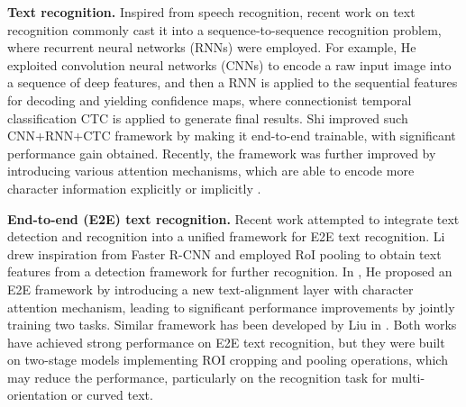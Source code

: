 \documentclass[10pt,twocolumn,letterpaper]{article}
\begin{document}
\textbf{Text recognition.} Inspired from speech recognition, recent work on text recognition commonly cast it into a sequence-to-sequence recognition problem, where recurrent neural networks (RNNs) were employed. For example, He \etal \cite{he2016reading} exploited convolution neural networks (CNNs) to encode a raw input image into a sequence of deep features, and then a RNN is applied to the sequential features for decoding and yielding confidence maps, where connectionist temporal classification CTC \cite{graves2006connectionist} is applied to generate final results. Shi \etal \cite{shi2017end} improved such CNN+RNN+CTC framework by making it end-to-end trainable, with significant performance gain obtained. Recently, the framework was further improved by introducing various attention mechanisms, which are able to encode more character information explicitly or implicitly \cite{shi2018aster, cheng2017iccv,bai2018cvpr,he2018end}.



\textbf{End-to-end (E2E) text recognition.} Recent work attempted to integrate text detection and recognition into a unified framework for E2E text recognition. Li \etal \cite{li2017towards} drew inspiration from Faster R-CNN \cite{ren2015faster} and employed RoI pooling to obtain text features from a detection framework for further recognition.
In \cite{he2018end}, He \etal proposed an E2E framework by introducing a new text-alignment layer with character attention mechanism, leading to significant performance improvements by jointly training two tasks. Similar framework has been developed by Liu \etal in \cite{liu2018fots}. Both works have achieved strong performance on E2E text recognition, but they were built on two-stage models implementing ROI cropping and pooling operations, which may reduce the performance, particularly on the recognition task for multi-orientation or curved text.
\end{document}
